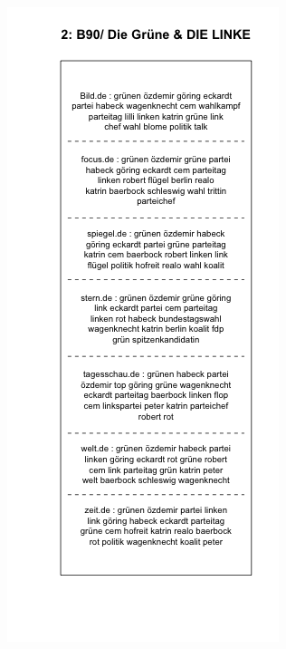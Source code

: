 \documentclass[12pt,a4paper,notitlepage]{article}
\begin{document}
{\begin{figure}[H]
\begin{center}
\begin{subfigure}[normla]{0.49\textwidth}
		\end{subfigure}
		\begin{subfigure}[normla]{0.49\textwidth}
			\includegraphics[width=\textwidth]{../figs/plotquote2.png}
		\end{subfigure}
	\end{center}
\end{figure}
	
}
\end{document}
